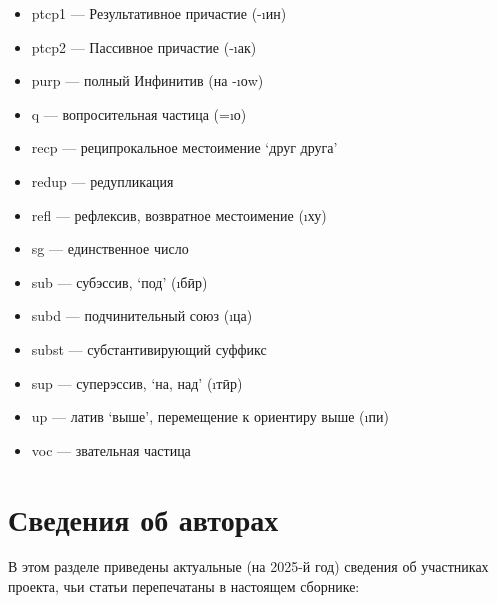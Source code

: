 {\begin{itemize}
  \item {\sc ptcp1} — Результативное причастие (-\i{ин})
  \item {\sc ptcp2} — Пассивное причастие (-\i{ак})
  \item {\sc purp} — полный Инфинитив (на -\i{оw})
  \item {\sc q} — вопросительная частица (=\i{о})
  \item {\sc recp} — реципрокальное местоимение ‘друг друга’
  \item {\sc redup} — редупликация
  \item {\sc refl} — рефлексив, возвратное местоимение (\i{ху})
  \item {\sc sg} — единственное число
  \item {\sc sub} — субэссив, ‘под’ (\i{бӣр})
  \item {\sc subd} — подчинительный союз (\i{ца})
  \item {\sc subst} — субстантивирующий суффикс
  \item {\sc sup} — суперэссив, ‘на, над’ (\i{тӣр})
  \item {\sc up} — латив ‘выше’, перемещение к ориентиру выше (\i{пи})
  \item {\sc voc} — звательная частица
\end{itemize}}

\section*{Сведения об авторах}

В этом разделе приведены актуальные (на 2025-й год) сведения об участниках проекта, чьи статьи перепечатаны в настоящем сборнике:

